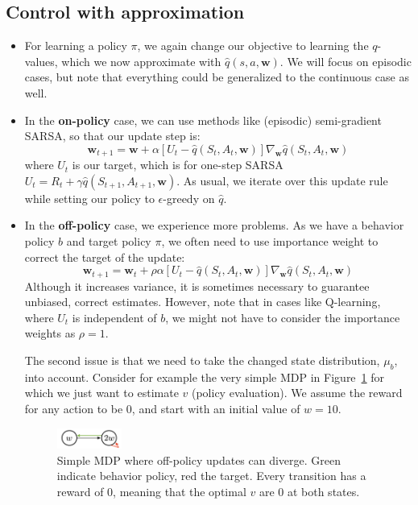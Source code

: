 \subsection{Control with approximation}
\begin{itemize}
	\item For learning a policy $\pi$, we again change our objective to learning the $q$-values, which we now approximate with $\hat{q}(s,a,\bm{w})$. We will focus on episodic cases, but note that everything could be generalized to the continuous case as well.
	\item In the \textbf{on-policy} case, we can use methods like (episodic) semi-gradient SARSA, so that our update step is:
	$$\bm{w}_{t+1}=\bm{w}+\alpha\left[U_t - \hat{q}(S_t,A_t,\bm{w})\right]\nabla_{\bm{w}}\hat{q}(S_t,A_t,\bm{w})$$
	where $U_t$ is our target, which is for one-step SARSA $U_t = R_t + \gamma \hat{q}(S_{t+1},A_{t+1},\bm{w})$.
	As usual, we iterate over this update rule while setting our policy to $\epsilon$-greedy on $\hat{q}$.
	\item In the \textbf{off-policy} case, we experience more problems. As we have a behavior policy $b$ and target policy $\pi$, we often need to use importance weight to correct the target of the update:
	$$\bm{w}_{t+1}=\bm{w}_{t}+\rho \alpha\left[U_t - \hat{q}(S_t,A_t,\bm{w})\right]\nabla_{\bm{w}}\hat{q}(S_t,A_t,\bm{w})$$
	Although it increases variance, it is sometimes necessary to guarantee unbiased, correct estimates. However, note that in cases like Q-learning, where $U_t$ is independent of $b$, we might not have to consider the importance weights as $\rho=1$.
	
	The second issue is that we need to take the changed state distribution, $\mu_b$, into account. Consider for example the very simple MDP in Figure~\ref{fig:rl_approximation_value_based_offpolicy_divergence} for which we just want to estimate $v$ (policy evaluation). We assume the reward for any action to be $0$, and start with an initial value of $w=10$.
		
	\begin{figure}[ht!]
		\centering
		\includegraphics[width=0.2\textwidth]{figures/rl_approximation_value_based_offpolicy_divergence.png}
		\caption{Simple MDP where off-policy updates can diverge. Green indicate behavior policy, red the target. Every transition has a reward of $0$, meaning that the optimal $v$ are 0 at both states.}
		\label{fig:rl_approximation_value_based_offpolicy_divergence}
	\end{figure}
	

\end{itemize}
